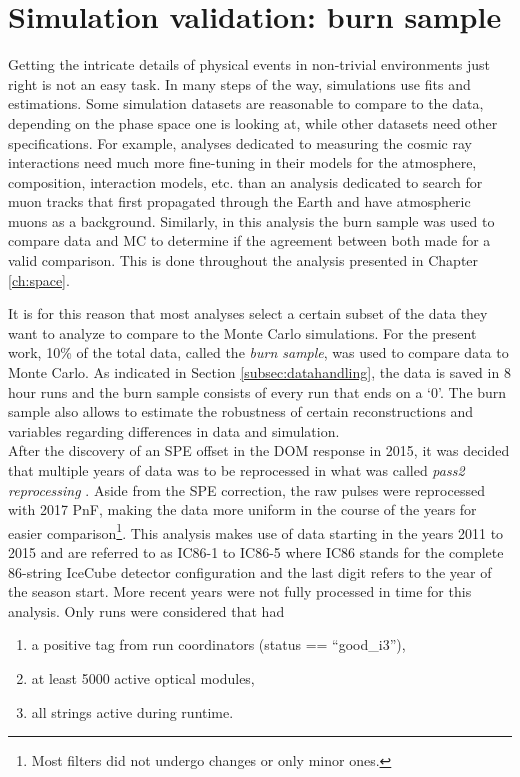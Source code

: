 \section{Simulation validation: burn sample}
\label{sec:burnsample}
Getting the intricate details of physical events in non-trivial environments just right is not an easy task. In many steps of the way, simulations use fits and estimations. Some simulation datasets are reasonable to compare to the data, depending on the phase space one is looking at, while other datasets need other specifications. For example, analyses dedicated to measuring the cosmic ray interactions need much more fine-tuning in their models for the atmosphere, composition, interaction models, etc. than an analysis dedicated to search for muon tracks that first propagated through the Earth and have atmospheric muons as a background. Similarly, in this analysis the burn sample was used to compare data and MC to determine if the agreement between both made for a valid comparison. This is done throughout the analysis presented in Chapter \ref{ch:space}.

It is for this reason that most analyses select a certain subset of the data they want to analyze to compare to the Monte Carlo simulations. For the present work, 10\% of the total data, called the \textit{burn sample}, was used to compare data to Monte Carlo. As indicated in Section \ref{subsec:datahandling}, the data is saved in 8 hour runs and the burn sample consists of every run that ends on a `0'. The burn sample also allows to estimate the robustness of certain reconstructions and variables regarding differences in data and simulation.\\

\noindent After the discovery of an SPE offset in the DOM response in 2015, it was decided that multiple years of data was to be reprocessed in what was called \textit{pass2 reprocessing} \cite{pass2}. Aside from the SPE correction, the raw pulses were reprocessed with 2017 PnF, making the data more uniform in the course of the years for easier comparison\footnote{Most filters did not undergo changes or only minor ones.}. This analysis makes use of data starting in the years 2011 to 2015 and are referred to as IC86-1 to IC86-5 where IC86 stands for the complete 86-string IceCube detector configuration and the last digit refers to the year of the season start. More recent years were not fully processed in time for this analysis. Only runs were considered that had
\vspace{2mm}
\begin{enumerate}
\item a positive tag from run coordinators (status == ``good\_i3''),
\item at least 5000 active optical modules,
\item all strings active during runtime.
\end{enumerate}
\vspace{2mm}

